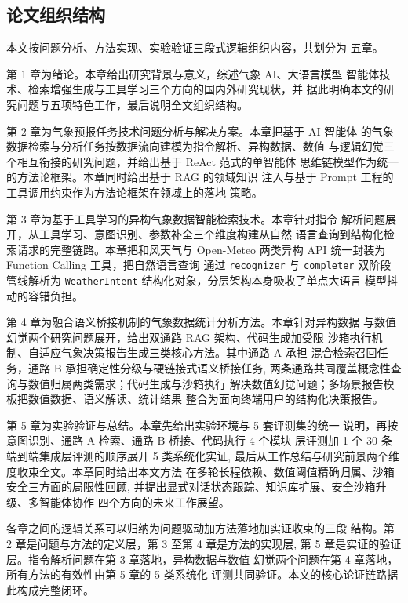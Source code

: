 %

\subsection{论文组织结构}
\label{sec:thesis-structure}

本文按问题分析、方法实现、实验验证三段式逻辑组织内容，共划分为
五章。

第 1 章为绪论。本章给出研究背景与意义，综述气象 AI、大语言模型
智能体技术、检索增强生成与工具学习三个方向的国内外研究现状，并
据此明确本文的研究问题与五项特色工作，最后说明全文组织结构。

第 2 章为气象预报任务技术问题分析与解决方案。本章把基于 AI 智能体
的气象数据检索与分析任务按数据流向建模为指令解析、异构数据、数值
与逻辑幻觉三个相互衔接的研究问题，并给出基于 ReAct 范式的单智能体
思维链模型作为统一的方法论框架。本章同时给出基于 RAG 的领域知识
注入与基于 Prompt 工程的工具调用约束作为方法论框架在领域上的落地
策略。

第 3 章为基于工具学习的异构气象数据智能检索技术。本章针对指令
解析问题展开，从工具学习、意图识别、参数补全三个维度构建从自然
语言查询到结构化检索请求的完整链路。本章把和风天气与 Open-Meteo
两类异构 API 统一封装为 Function Calling 工具，把自然语言查询
通过 \texttt{recognizer} 与 \texttt{completer} 双阶段管线解析为
\texttt{WeatherIntent} 结构化对象，分层架构本身吸收了单点大语言
模型抖动的容错负担。

第 4 章为融合语义桥接机制的气象数据统计分析方法。本章针对异构数据
与数值幻觉两个研究问题展开，给出双通路 RAG 架构、代码生成加受限
沙箱执行机制、自适应气象决策报告生成三类核心方法。其中通路 A 承担
混合检索召回任务，通路 B 承担确定性分级与硬链接式语义桥接任务,
两条通路共同覆盖概念性查询与数值归属两类需求；代码生成与沙箱执行
解决数值幻觉问题；多场景报告模板把数值数据、语义解读、统计结果
整合为面向终端用户的结构化决策报告。

第 5 章为实验验证与总结。本章先给出实验环境与 5 套评测集的统一
说明，再按意图识别、通路 A 检索、通路 B 桥接、代码执行 4 个模块
层评测加 1 个 30 条端到端集成层评测的顺序展开 5 类系统化实证,
最后从工作总结与研究前景两个维度收束全文。本章同时给出本文方法
在多轮长程依赖、数值阈值精确归属、沙箱安全三方面的局限性回顾,
并提出显式对话状态跟踪、知识库扩展、安全沙箱升级、多智能体协作
四个方向的未来工作展望。

各章之间的逻辑关系可以归纳为问题驱动加方法落地加实证收束的三段
结构。第 2 章是问题与方法的定义层，第 3 至第 4 章是方法的实现层,
第 5 章是实证的验证层。指令解析问题在第 3 章落地，异构数据与数值
幻觉两个问题在第 4 章落地，所有方法的有效性由第 5 章的 5 类系统化
评测共同验证。本文的核心论证链路据此构成完整闭环。

